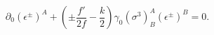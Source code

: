 \begin{equation}
\partial_0 (\epsilon^{\pm})^A+(\pm\frac{f'}{2f}-\frac{k}{2})\gamma_0
(\sigma^3)^A_B (\epsilon^\pm)^B=0.
\end{equation}

